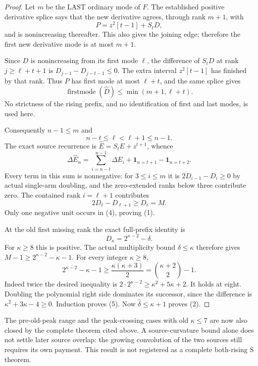 \begin{proof}
Let $m$ be the LAST ordinary mode of $F$. The established positive
derivative splice says that the new derivative agrees, through rank
$m+1$, with
\[
                     P=z^2[t-1]+S_tD,
\]
and is nonincreasing thereafter. This also gives the joining edge;
therefore the first new derivative mode is at most $m+1$.

Since $D$ is nonincreasing from its first mode $\ell$, the difference
of $S_tD$ at rank $j\ge\ell+t+1$ is
$D_{j-1}-D_{j-t-1}\le0$. The extra interval $z^2[t-1]$ has
finished by that rank. Thus $P$ has first mode at most $\ell+t$,
and the same splice gives
\[
               \operatorname{firstmode}(\widehat D)
                         \le\min(m+1,\ell+t).                 \tag{3}
\]
No strictness of the rising prefix, and no identification of first
and last modes, is used here.

Consequently $n-1\le m$ and
\[
                       n-t\le\ell<\ell+1\le n-1.
\]
The exact source recurrence is
$\widehat E=S_tE+z^{t+1}$, whence
\[
 \Delta\widehat E_n
   =\sum_{i=n-t}^{n-1}\Delta E_i
                      +\mathbf1_{n=t+1}-\mathbf1_{n=t+2}.      \tag{4}
\]
Every term in this sum is nonnegative: for $3\le i\le m$ it is
$2D_{i-1}-D_i\ge0$ by actual single-arm doubling, and the
zero-extended ranks below three contribute zero. The contained rank
$i=\ell+1$ contributes
\[
               2D_\ell-D_{\ell+1}\ge D_\ell=M.
\]
Only one negative unit occurs in (4), proving (1).

At the old first missing rank the exact full-prefix identity is
\[
                 D_\kappa=2^{\kappa-2}-\delta.
\]
For $\kappa\ge8$ this is positive. The actual multiplicity bound
$\delta\le\kappa$ therefore gives
$M-1\ge2^{\kappa-2}-\kappa-1$.
For every integer $\kappa\ge8$,
\[
        2^{\kappa-2}-\kappa-1
                   \ge\frac{\kappa(\kappa+3)}2
                   =\binom{\kappa+2}{2}-1.                    \tag{5}
\]
Indeed twice the desired inequality is
$2\cdot2^{\kappa-2}\ge\kappa^2+5\kappa+2$.
It holds at eight. Doubling the polynomial right side dominates
its successor, since the difference is $\kappa^2+3\kappa-4\ge0$.
Induction proves (5). Now
$\widehat\delta\le\kappa+1$ proves (2).
\end{proof}

The pre-old-peak range and the peak-crossing cases with old
$\kappa\le7$ are now also closed by the complete theorem cited above.
A source-curvature bound alone does not settle later
source overlap: the growing convolution of the two sources still
requires its own payment. This result is not registered as a complete
both-rising S theorem.
